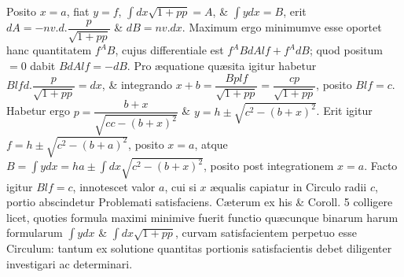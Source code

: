 Posito $x=a$, fiat $y=f$, $\int dx\sqrt{1+pp}=A$, \& $\int ydx=B$, erit $dA=-nv.d.\dfrac{p}{\sqrt{1+pp}}$ \& $dB=nv.dx$. Maximum ergo minimumve esse oportet hanc quantitatem $f^AB$, cujus differentiale est $f^ABdAlf+f^AdB$; quod positum $=0$ dabit $BdAlf=-dB$. Pro æquatione quæsita igitur habetur $Blfd.\dfrac{p}{\sqrt{1+pp}}=dx$, \& integrando $x+b=\dfrac{Bplf}{\sqrt{1+pp}}=\dfrac{cp}{\sqrt{1+pp}}$, posito $Blf=c$. Habetur ergo $p=\dfrac{b+x}{\sqrt{cc-(b+x)^2}}$ \& $y=h\pm\sqrt{c^2-(b+x)^2}$. Erit igitur $f=h\pm\sqrt{c^2-(b+a)^2}$, posito $x=a$, atque $B=\int ydx=ha\pm\int dx\sqrt{c^2-(b+x)^2}$, posito post integrationem $x=a$. Facto igitur $Blf=c$, innotescet valor $a$, cui si $x$ æqualis capiatur in Circulo radii $c$, portio abscindetur Problemati satisfaciens. Cæterum ex his \& Coroll. 5 colligere licet, quoties formula maximi minimive fuerit functio quæcunque binarum harum formularum $\int ydx$ \& $\int dx\sqrt{1+pp}$, curvam satisfacientem perpetuo esse Circulum: tantum ex solutione quantitas portionis satisfacientis debet diligenter investigari ac determinari.

